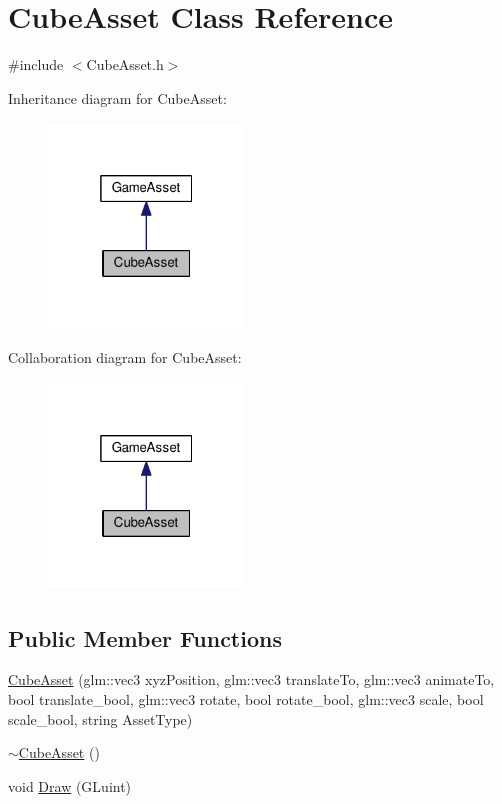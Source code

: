 \hypertarget{class_cube_asset}{}\section{Cube\+Asset Class Reference}
\label{class_cube_asset}


{\ttfamily \#include $<$Cube\+Asset.\+h$>$}



Inheritance diagram for Cube\+Asset\+:\nopagebreak
\begin{figure}[H]
\begin{center}
\leavevmode
\includegraphics[width=148pt]{class_cube_asset__inherit__graph}
\end{center}
\end{figure}


Collaboration diagram for Cube\+Asset\+:\nopagebreak
\begin{figure}[H]
\begin{center}
\leavevmode
\includegraphics[width=148pt]{class_cube_asset__coll__graph}
\end{center}
\end{figure}
\subsection*{Public Member Functions}
\begin{DoxyCompactItemize}
\item 
\hyperlink{class_cube_asset_a77f29d64dc1ed34067948d73302a4d4f}{Cube\+Asset} (glm\+::vec3 xyz\+Position, glm\+::vec3 translate\+To, glm\+::vec3 animate\+To, bool translate\+\_\+bool, glm\+::vec3 rotate, bool rotate\+\_\+bool, glm\+::vec3 scale, bool scale\+\_\+bool, string Asset\+Type)
\item 
\hyperlink{class_cube_asset_ab3ab9a5da82cbf8537a28652410093b1}{$\sim$\+Cube\+Asset} ()
\item 
void \hyperlink{class_cube_asset_a1af568486056e254ffcf98fd99947bfe}{Draw} (G\+Luint)
\end{DoxyCompactItemize}


